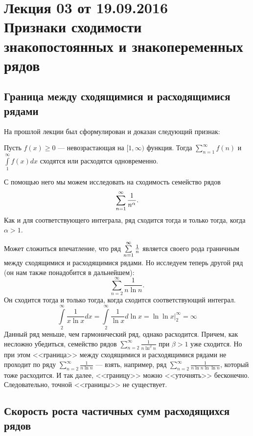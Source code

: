 \section{Лекция 03 от 19.09.2016 \\Признаки сходимости знакопостоянных и знакопеременных рядов}

\subsection{Граница между сходящимися и расходящимися рядами}

На прошлой лекции был сформулирован и доказан следующий признак:
\begin{Test}

Пусть $f(x) \geqslant 0$ --- невозрастающая на $[1, \infty)$ функция. Тогда $\sum\limits_{n=1}^{\infty}f(n)$ и $\int\limits_1^{\infty}f(x)dx$ сходятся или расходятся одновременно.
\end{Test}

С помощью него мы можем исследовать на сходимость семейство рядов
$$
\sum\limits_{n=1}^{\infty} \frac{1}{n^\alpha}.
$$
Как и для соответствующего интеграла, ряд сходится тогда и только тогда, когда $\alpha > 1$.

Может сложиться впечатление, что ряд $\sum\limits_{n=1}^{\infty} \frac{1}{n}$ является своего рода граничным между сходящимися и расходящимися рядами. Но исследуем теперь другой ряд (он нам также понадобится в дальнейшем):
$$
\sum\limits_{n=2}^{\infty} \frac{1}{n\ln n}.
$$
Он сходится тогда и только тогда, когда сходится соответствующий интеграл.
$$
\int\limits_{2}^{\infty} \frac{1}{x\ln x}dx = \int\limits_{2}^{\infty} \frac{1}{\ln x} d\ln x = \ln\ln x \Big|_2^{\infty} = \infty
$$
Данный ряд меньше, чем гармонический ряд, однако расходится. Причем, как несложно убедиться, семейство рядов $\sum\limits_{n=2}^{\infty}\frac{1}{n\ln^\beta n}$ при $\beta > 1$ уже сходится. Но при этом <<граница>> между сходящимися и расходящимися рядами не проходит по ряду $\sum\limits_{n=2}^{\infty} \frac{1}{n\ln n}$ --- взять, например, ряд $\sum\limits_{n=2}^{\infty}\frac{1}{n\ln n \ln\ln n}$, который тоже расходится. И так далее, <<границу>> можно <<уточнять>> бесконечно. Следовательно, точной <<границы>> не существует.

\subsection{Скорость роста частичных сумм расходящихся рядов}

